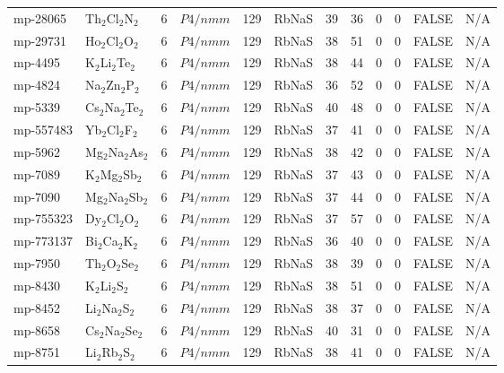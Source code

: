 {\begin{longtable}{llcccccccccc}
    mp-28065 & Th$_{2}$Cl$_{2}$N$_{2}$ & 6     & $P4/nmm$ & 129   & RbNaS & 39    & 36    & 0     & 0     & FALSE & N/A \\
    mp-29731 & Ho$_{2}$Cl$_{2}$O$_{2}$ & 6     & $P4/nmm$ & 129   & RbNaS & 38    & 51    & 0     & 0     & FALSE & N/A \\
    mp-4495 & K$_{2}$Li$_{2}$Te$_{2}$ & 6     & $P4/nmm$ & 129   & RbNaS & 38    & 44    & 0     & 0     & FALSE & N/A \\
    mp-4824 & Na$_{2}$Zn$_{2}$P$_{2}$ & 6     & $P4/nmm$ & 129   & RbNaS & 36    & 52    & 0     & 0     & FALSE & N/A \\
    mp-5339 & Cs$_{2}$Na$_{2}$Te$_{2}$ & 6     & $P4/nmm$ & 129   & RbNaS & 40    & 48    & 0     & 0     & FALSE & N/A \\
    mp-557483 & Yb$_{2}$Cl$_{2}$F$_{2}$ & 6     & $P4/nmm$ & 129   & RbNaS & 37    & 41    & 0     & 0     & FALSE & N/A \\
    mp-5962 & Mg$_{2}$Na$_{2}$As$_{2}$ & 6     & $P4/nmm$ & 129   & RbNaS & 38    & 42    & 0     & 0     & FALSE & N/A \\
    mp-7089 & K$_{2}$Mg$_{2}$Sb$_{2}$ & 6     & $P4/nmm$ & 129   & RbNaS & 37    & 43    & 0     & 0     & FALSE & N/A \\
    mp-7090 & Mg$_{2}$Na$_{2}$Sb$_{2}$ & 6     & $P4/nmm$ & 129   & RbNaS & 37    & 44    & 0     & 0     & FALSE & N/A \\
    mp-755323 & Dy$_{2}$Cl$_{2}$O$_{2}$ & 6     & $P4/nmm$ & 129   & RbNaS & 37    & 57    & 0     & 0     & FALSE & N/A \\
    mp-773137 & Bi$_{2}$Ca$_{2}$K$_{2}$ & 6     & $P4/nmm$ & 129   & RbNaS & 36    & 40    & 0     & 0     & FALSE & N/A \\
    mp-7950 & Th$_{2}$O$_{2}$Se$_{2}$ & 6     & $P4/nmm$ & 129   & RbNaS & 38    & 39    & 0     & 0     & FALSE & N/A \\
    mp-8430 & K$_{2}$Li$_{2}$S$_{2}$ & 6     & $P4/nmm$ & 129   & RbNaS & 38    & 51    & 0     & 0     & FALSE & N/A \\
    mp-8452 & Li$_{2}$Na$_{2}$S$_{2}$ & 6     & $P4/nmm$ & 129   & RbNaS & 38    & 37    & 0     & 0     & FALSE & N/A \\
    mp-8658 & Cs$_{2}$Na$_{2}$Se$_{2}$ & 6     & $P4/nmm$ & 129   & RbNaS & 40    & 31    & 0     & 0     & FALSE & N/A \\
    mp-8751 & Li$_{2}$Rb$_{2}$S$_{2}$ & 6     & $P4/nmm$ & 129   & RbNaS & 38    & 41    & 0     & 0     & FALSE & N/A \\

\end{longtable}}
